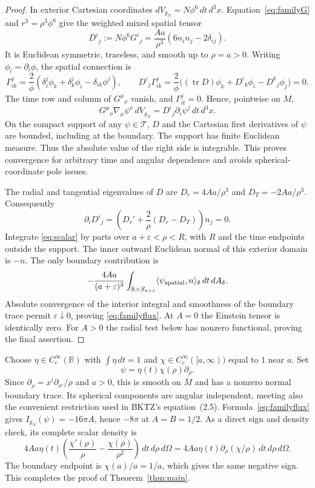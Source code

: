 \documentclass[11pt]{article}
\newcommand{\tr}{\operatorname{tr}}
\newcommand{\dV}{\,dV}
\newcommand{\dA}{\,dA}
\begin{document}
\begin{proof}
In exterior Cartesian coordinates $dV_{g_N}=N\phi^6\,dt\,d^3x$.
Equation~\eqref{eq:familyG} and $r^3=\rho^3\phi^6$ give the weighted mixed
spatial tensor
\begin{equation}\label{eq:D}
 D^i{}_j:=N\phi^6G^i{}_j
    =\frac{Aa}{\rho^3}(6n_i n_j-2\delta_{ij}).
\end{equation}
It is Euclidean symmetric, traceless, and smooth up to $\rho=a>0$.
Writing $\phi_i=\partial_i\phi$, the spatial connection is
\[
 \Gamma^j_{ik}=\frac2\phi
    (\delta^j_i\phi_k+\delta^j_k\phi_i-\delta_{ik}\phi^j),
 \qquad
 D^i{}_j\Gamma^j_{ik}
 =\frac2\phi\bigl((\tr D)\phi_k+D^i{}_k\phi_i-D^k{}_j\phi_j\bigr)=0.
\]
The time row and column of $G^\mu{}_{\nu}$ vanish, and
$\Gamma^j_{it}=0$. Hence, pointwise on $M$,
\begin{equation}\label{eq:scalar}
 G^\mu{}_{\nu}\nabla_\mu\psi^\nu\dV_{g_N}
       =D^i{}_j\partial_i\psi^j\,dt\,d^3x.
\end{equation}
On the compact support of any $\psi\in\mathcal T$, $D$ and the Cartesian
first derivatives of $\psi$ are bounded, including at the boundary.
The support has finite Euclidean measure. Thus the absolute value of the
right side is integrable. This proves convergence for arbitrary time and
angular dependence and avoids spherical-coordinate pole issues.

The radial and tangential eigenvalues of $D$ are
$D_r=4Aa/\rho^3$ and $D_T=-2Aa/\rho^3$. Consequently
\[
 \partial_iD^i{}_j
 =\left(D_r'+\frac2\rho(D_r-D_T)\right)n_j=0.
\]
Integrate \eqref{eq:scalar} by parts over $a+\varepsilon<\rho<R$, with $R$
and the time endpoints outside the support. The inner outward Euclidean
normal of this exterior domain is $-n$. The only boundary contribution is
\[
 -\frac{4Aa}{(a+\varepsilon)^3}
  \int_{\mathbb R\times S_{a+\varepsilon}}
       \langle\psi_{\rm spatial},n\rangle_\delta\,dt\dA_\delta.
\]
Absolute convergence of the interior integral and smoothness of the
boundary trace permit $\varepsilon\downarrow0$, proving
\eqref{eq:familyflux}. At $A=0$ the Einstein tensor is identically zero.
For $A>0$ the radial test below has nonzero functional, proving the final
assertion.
\end{proof}

Choose $\eta\in C_c^\infty(\mathbb R)$ with $\int\eta\,dt=1$ and
$\chi\in C_c^\infty([a,\infty))$ equal to $1$ near $a$. Set
\begin{equation}\label{eq:test}
 \psi=\eta(t)\chi(\rho)\partial_\rho.
\end{equation}
Since $\partial_\rho=x^i\partial_{x^i}/\rho$ and $a>0$, this is smooth on
$\overline M$ and has a nonzero normal boundary trace. Its spherical
components are angular independent, meeting also the convenient restriction
used in BKTZ's equation~(2.5). Formula~\eqref{eq:familyflux} gives
$I_{g_N}(\psi)=-16\pi A$, hence $-8\pi$ at $A=B=1/2$.
As a direct sign and density check, its complete scalar density is
\[
 4Aa\eta(t)\left(\frac{\chi'(\rho)}\rho-
                     \frac{\chi(\rho)}{\rho^2}\right)
        \,dt\,d\rho\,d\Omega
 =4Aa\eta(t)\partial_\rho(\chi/\rho)\,dt\,d\rho\,d\Omega.
\]
The boundary endpoint is $\chi(a)/a=1/a$, which gives the same negative
sign. This completes the proof of Theorem~\ref{thm:main}.
\end{document}
